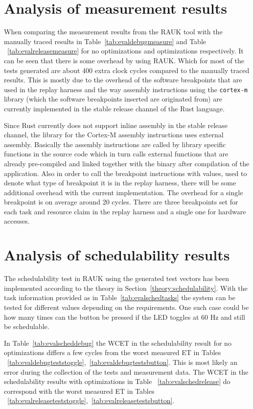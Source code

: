 \section{Analysis of measurement results}
When comparing the measurement results from the RAUK tool with the manually
traced results in Table~\ref{tab:evaldebugmeasure} and Table
~\ref{tab:evalreleasemeasure} for no optimizations and optimizations
respectively. It can be seen that there is some overhead by using RAUK\@. Which
for most of the tests generated are about 400 extra clock cycles compared to
the manually traced results. This is mostly due to the overhead of the software
breakpoints that are used in the replay harness and the way assembly
instructions using the \texttt{cortex-m} library (which the software
breakpoints inserted are originated from) are currently implemented in the
stable release channel of the Rust language.

Since Rust currently does not support inline assembly in the stable release
channel, the library for the Cortex-M assembly instructions uses external
assembly. Basically the assembly instructions are called by library specific
functions in the source code which in turn calls external functions that are
already pre-compiled and linked together with the binary after compilation of
the application. Also in order to call the breakpoint instructions with values,
used to denote what type of breakpoint it is in the replay harness, there will
be some additional overhead with the current implementation. The overhead for a
single breakpoint is on average around 20 cycles. There are three breakpoints
set for each task and resource claim in the replay harness and a single one for
hardware accesses.

\section{Analysis of schedulability results}
The schedulability test in RAUK using the generated test vectors has been
implemented according to the theory in Section~\ref{theory:schedulability}.
With the task information provided as in Table~\ref{tab:evalschedtasks} the
system can be tested for different values depending on the requirements. One
such case could be how many times can the button be pressed if the LED toggles
at 60 Hz and still be schedulable.

In Table~\ref{tab:evalscheddebug} the WCET in the schedulability result for no
optimizations differs a few cycles from the worst measured ET in Tables
~\ref{tab:evaldebugteststoggle},~\ref{tab:evaldebugtestsbutton}. This is most
likely an error during the collection of the tests and measurement data. The
WCET in the schedulability results with optimizations in Table
~\ref{tab:evalschedrelease} do correspond with the worst measured ET in Tables
~\ref{tab:evalreleaseteststoggle},~\ref{tab:evalreleasetestsbutton}.

